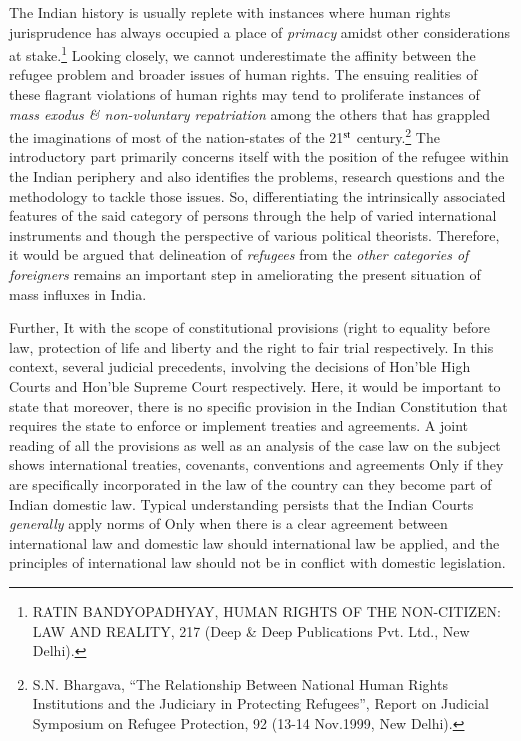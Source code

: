 \begin{multicols}{2}

\noi
The Indian history is usually replete with instances where human rights jurisprudence has
always occupied a place of \textit{primacy} amidst other considerations at stake.\footnote{RATIN BANDYOPADHYAY, HUMAN RIGHTS OF THE NON-CITIZEN: LAW AND REALITY, 217 (Deep \& Deep Publications Pvt. Ltd., New Delhi).} Looking closely, we cannot underestimate the affinity between the refugee problem and broader issues of human rights. The ensuing realities of these flagrant violations of human rights may tend to
proliferate instances of \textit{mass exodus \& non-voluntary repatriation} among the others that has
grappled the imaginations of most of the nation-states of the 21$^{\rm st}$ century.\footnote{S.N. Bhargava, “The Relationship Between National Human Rights Institutions and the Judiciary in Protecting Refugees”, Report on Judicial Symposium on Refugee Protection, 92 (13-14 Nov.1999, New Delhi).} The introductory
part primarily concerns itself with the position of the refugee within the Indian periphery and
also identifies the problems, research questions and the methodology to tackle those issues.
So, differentiating the intrinsically associated features of the said category of persons through
the help of varied international instruments and though the perspective of various political
theorists. Therefore, it would be argued that delineation of \textit{refugees} from the \textit{other categories
of foreigners} remains an important step in ameliorating the present situation of mass influxes
in India.

\noi
Further, It with the scope of constitutional provisions (right to equality before law, protection
of life and liberty and the right to fair trial respectively. In this context, several judicial
precedents, involving the decisions of Hon’ble High Courts and Hon’ble Supreme Court
respectively. Here, it would be important to state that moreover, there is no specific provision
in the Indian Constitution that requires the state to enforce or implement treaties and
agreements. A joint reading of all the provisions as well as an analysis of the case law on the
subject shows international treaties, covenants, conventions and agreements Only if they are
specifically incorporated in the law of the country can they become part of Indian domestic
law. Typical understanding persists that the Indian Courts \textit{generally} apply norms of Only
when there is a clear agreement between international law and domestic law should
international law be applied, and the principles of international law should not be in conflict
with domestic legislation.


\end{multicols}
